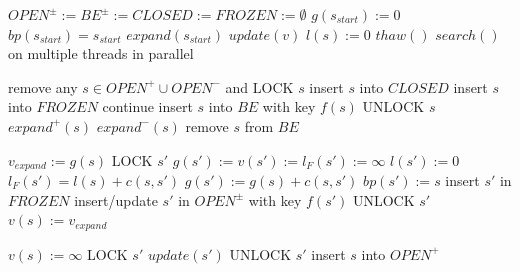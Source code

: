 \documentclass[letterpaper]{article}
\begin{document}
\begin{algorithm}
\caption{$main()$}
\label{alg:main}
\begin{algorithmic}
\STATE $OPEN^\pm := BE^\pm := CLOSED := FROZEN := \emptyset$
\STATE $g(s_{start}) := 0$
\STATE $bp(s_{start}) = s_{start}$
\STATE $expand(s_{start})$
\REPEAT
{}
\STATE $update(v)$
\STATE $l(s) := 0$
\ENDFOR
\ENDIF
\ENDFOR
\STATE $thaw()$
\STATE $search()$ on multiple threads in parallel
\end{algorithmic}
\end{algorithm}

\begin{algorithm}
\caption{$search()$}
\label{alg:search}
\begin{algorithmic}
\STATE remove any $s\in OPEN^+\cup OPEN^-$ and LOCK $s$
\STATE insert $s$ into $CLOSED$
\STATE insert $s$ into $FROZEN$
\STATE continue
\ENDIF
\ENDIF
\STATE insert $s$ into $BE$ with key $f(s)$
\STATE UNLOCK $s$
\STATE $expand^+(s)$
\ELSE
\STATE $expand^-(s)$
\ENDIF
\STATE remove $s$ from $BE$
\ENDWHILE
\end{algorithmic}
\end{algorithm}

\begin{algorithm}
\caption{$expand^+(s)$}
\label{alg:expandplus}
\begin{algorithmic}
\STATE $v_{expand} := g(s)$
\STATE LOCK $s'$
\STATE $g(s') := v(s') := l_F(s') := \infty$
\STATE $l(s') := 0$
\ENDIF
{}
\STATE $l_F(s') = l(s) + c(s,s')$
\ENDIF
{}
\STATE $g(s') := g(s) + c(s,s')$
\STATE $bp(s') := s$
\STATE insert $s'$ in $FROZEN$
\ELSE
\STATE insert/update $s'$ in $OPEN^\pm$ with key $f(s')$
\ENDIF
\ENDIF
\STATE UNLOCK $s'$
\ENDFOR
\STATE $v(s) := v_{expand}$
\end{algorithmic}
\end{algorithm}

\begin{algorithm}
\caption{$expand^-(s)$}
\label{alg:expandminus}
\begin{algorithmic}
\STATE $v(s) := \infty$
\STATE LOCK $s'$
\STATE $update(s')$
\ENDIF
\STATE UNLOCK $s'$
\ENDFOR
\STATE insert $s$ into $OPEN^+$
\end{algorithmic}
\end{algorithm}
\end{document}
